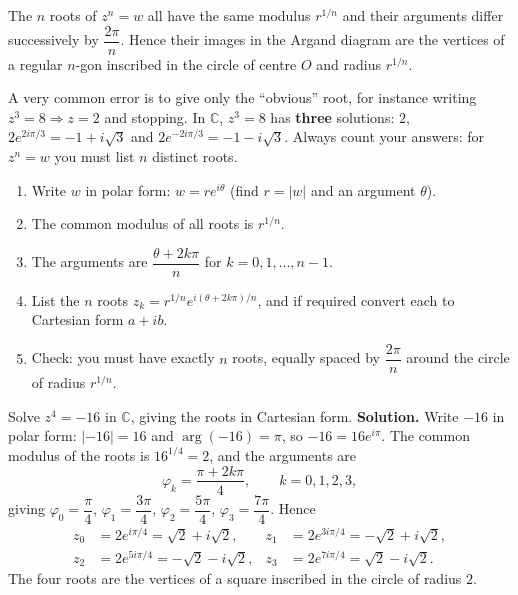 \documentclass[11pt]{article}
\newcommand{\cle}[1]{{\popxbold\color{popdark}#1}}
\begin{document}
\begin{propriete}
The $n$ roots of $z^n=w$ all have the same modulus $r^{1/n}$ and their arguments differ successively by $\dfrac{2\pi}{n}$. Hence their images in the Argand diagram are the vertices of a \cle{regular $n$-gon} inscribed in the circle of centre $O$ and radius $r^{1/n}$.
\end{propriete}

\begin{attention}
A very common error is to give only the ``obvious'' root, for instance writing $z^3=8\Rightarrow z=2$ and stopping. In $\mathbb{C}$, $z^3=8$ has \textbf{three} solutions: $2$, $2e^{2i\pi/3}=-1+i\sqrt3$ and $2e^{-2i\pi/3}=-1-i\sqrt3$. Always count your answers: for $z^n=w$ you must list $n$ distinct roots.
\end{attention}

\begin{methode}[Solving $z^n=w$ step by step]
\begin{enumerate}
\item Write $w$ in polar form: $w=re^{i\theta}$ (find $r=|w|$ and an argument $\theta$).
\item The common modulus of all roots is $r^{1/n}$.
\item The arguments are $\dfrac{\theta+2k\pi}{n}$ for $k=0,1,\dots,n-1$.
\item List the $n$ roots $z_k=r^{1/n}e^{i(\theta+2k\pi)/n}$, and if required convert each to Cartesian form $a+ib$.
\item Check: you must have exactly $n$ roots, equally spaced by $\dfrac{2\pi}{n}$ around the circle of radius $r^{1/n}$.
\end{enumerate}
\end{methode}

\begin{exoresolu}[Solving $z^4=-16$]
Solve $z^4=-16$ in $\mathbb{C}$, giving the roots in Cartesian form.
\tcblower
\textbf{Solution.} Write $-16$ in polar form: $|-16|=16$ and $\arg(-16)=\pi$, so $-16=16e^{i\pi}$. The common modulus of the roots is $16^{1/4}=2$, and the arguments are
\[
\varphi_k=\frac{\pi+2k\pi}{4},\qquad k=0,1,2,3,
\]
giving $\varphi_0=\dfrac{\pi}{4}$, $\varphi_1=\dfrac{3\pi}{4}$, $\varphi_2=\dfrac{5\pi}{4}$, $\varphi_3=\dfrac{7\pi}{4}$. Hence
\begin{align*}
z_0&=2e^{i\pi/4}=\sqrt2+i\sqrt2, &
z_1&=2e^{3i\pi/4}=-\sqrt2+i\sqrt2,\\
z_2&=2e^{5i\pi/4}=-\sqrt2-i\sqrt2, &
z_3&=2e^{7i\pi/4}=\sqrt2-i\sqrt2.
\end{align*}
The four roots are the vertices of a square inscribed in the circle of radius $2$.
\end{exoresolu}
\end{document}
